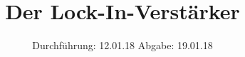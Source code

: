 

\subject{V303}
\title{Der Lock-In-Verstärker}
\date{%
  Durchführung: 12.01.18
  \hspace{3em}
  Abgabe: 19.01.18
}



\maketitle
\thispagestyle{empty}
\tableofcontents
\newpage






\printbibliography{}


